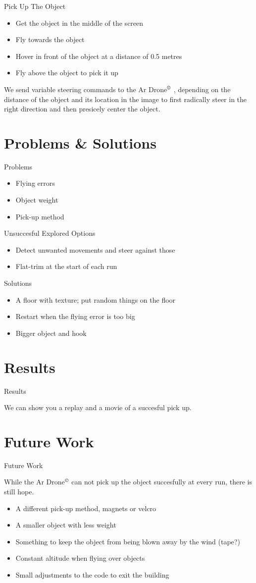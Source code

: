 \documentclass{beamer}
\newcommand{\Ardrone}{Ar Drone$^{\copyright}$ }
\newcommand{\slide}[2]
{
\begin{frame}
\begin{block}{#1} 

#2

\end{block} \end{frame}
}
\begin{document}
\slide{Pick Up The Object}{
\begin{itemize}
    \item Get the object in the middle of the screen
    \item Fly towards the object
    \item Hover in front of the object at a distance of 0.5 metres 
    \item Fly above the object to pick it up
\end{itemize}
We send variable steering commands to the \Ardrone, depending on the distance of the object and its location in the image to first radically steer in the right direction and then presicely center the object.
}


\section{Problems \& Solutions}
\slide{Problems}{
\begin{itemize}
    \item Flying errors
    \item Object weight
    \item Pick-up method
\end{itemize}
}

\slide{Unsuccesful Explored Options}{
\begin{itemize}
    \item Detect unwanted movements and steer against those
    \item Flat-trim at the start of each run
\end{itemize}
}

\slide{Solutions}{
\begin{itemize}
    \item A floor with texture; put random things on the floor 
    \item Restart when the flying error is too big
    \item Bigger object and hook
\end{itemize}
}


\section{Results}
\slide{Results}{
We can show you a replay and a movie of a succesful pick up. 
}

\section{Future Work}
\slide{Future Work}{
While the \Ardrone can not pick up the object succesfully at every run, there is 
still hope.
\begin{itemize}
    \item A different pick-up method, magnets or velcro
    \item A smaller object with less weight
    \item Something to keep the object from being blown away by the wind (tape?)
    \item Constant altitude when flying over objects
    \item Small adjustments to the code to exit the building
\end{itemize}
}
\end{document}
